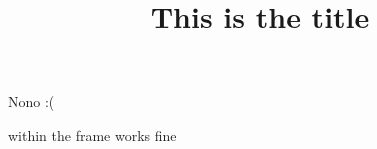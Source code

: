 \documentclass[
 ]{beamer}
\title[This is the rather long short title]{This is the title}
\begin{document}
\begin{frame}
\frametitle{{\insertshorttitle}}
  Nono :(

  \insertshorttitle within the frame works fine
\end{frame}
\end{document}
